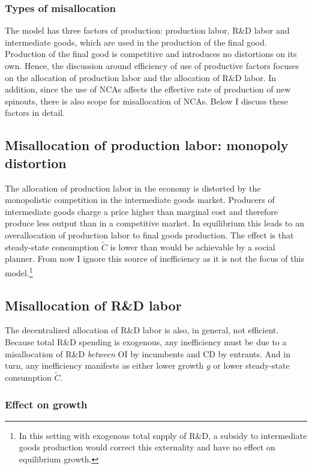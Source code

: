 \documentclass[11pt,english]{article}
\begin{document}
\subsubsection{Types of misallocation}

The model has three factors of production: production labor, R\&D labor and intermediate goods, which are used in the production of the final good. Production of the final good is competitive and introduces no distortions on its own. Hence, the discussion around efficiency of use of productive factors focuses on the allocation of production labor and the allocation of R\&D labor. In addition, since the use of NCAs affects the effective rate of production of new spinouts, there is also scope for misallocation of NCAs. Below I discuss these factors in detail.

\subsection{Misallocation of production labor: monopoly distortion}

The allocation of production labor in the economy is distorted by the monopolistic competition in the intermediate goods market. Producers of intermediate goods charge a price higher than marginal cost and therefore produce less output than in a competitive market. In equilibrium this leads to an overallocation of production labor to final goods production. The effect is that steady-state consumption $\tilde{C}$ is lower than would be achievable by a social planner. From now I ignore this source of inefficiency as it is not the focus of this model.\footnote{In this setting with exogenous total supply of R\&D, a subsidy to intermediate goods production would correct this externality and have no effect on equilibrium growth.}

\subsection{Misallocation of R\&D labor}\label{model:efficiency:misallocationRD}

The decentralized allocation of R\&D labor is also, in general, not efficient. Because total R\&D spending is exogenous, any inefficiency must be due to a misallocation of R\&D \textit{between} OI by incumbents and CD by entrants. And in turn, any inefficiency manifests as either lower growth $g$ or lower steady-state consumption $\tilde{C}$.

\subsubsection{Effect on growth}
\end{document}
